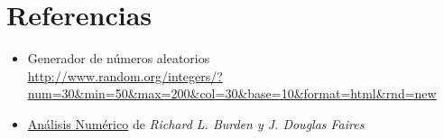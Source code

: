 \section{Referencias}
\label{referencias}

\begin{itemize}
\item Generador de números aleatorios\\
\url{http://www.random.org/integers/?num=30&min=50&max=200&col=30&base=10&format=html&rnd=new}

\item \underline{Análisis Numérico}  de \textit{Richard L. Burden y J. Douglas Faires}

\end{itemize}
